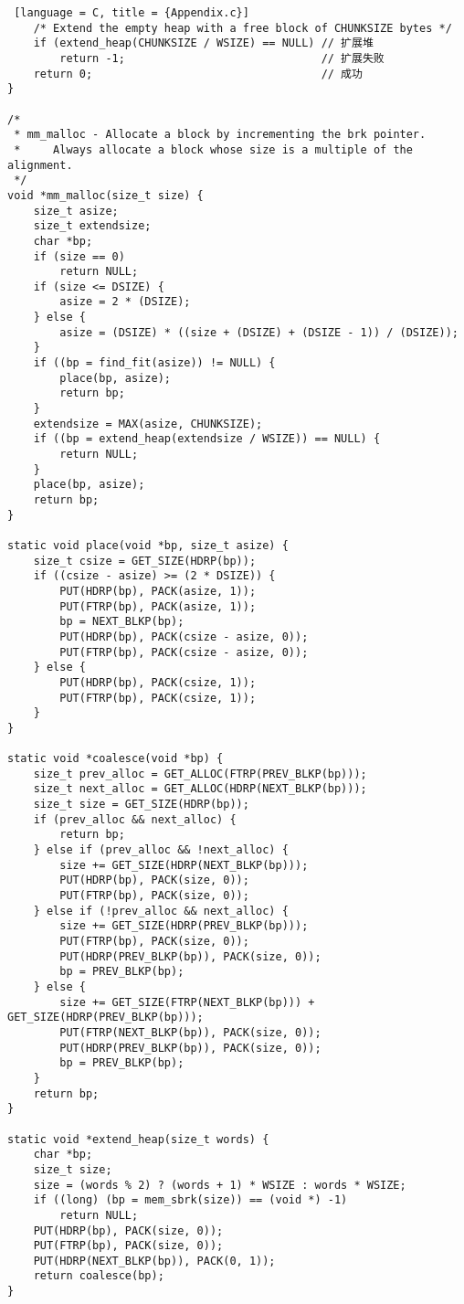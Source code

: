 \begin{lstlisting} [language = C, title = {Appendix.c}]
    /* Extend the empty heap with a free block of CHUNKSIZE bytes */
    if (extend_heap(CHUNKSIZE / WSIZE) == NULL) // 扩展堆
        return -1;                              // 扩展失败
    return 0;                                   // 成功
}

/*
 * mm_malloc - Allocate a block by incrementing the brk pointer.
 *     Always allocate a block whose size is a multiple of the alignment.
 */
void *mm_malloc(size_t size) {
    size_t asize;
    size_t extendsize;
    char *bp;
    if (size == 0)
        return NULL;
    if (size <= DSIZE) {
        asize = 2 * (DSIZE);
    } else {
        asize = (DSIZE) * ((size + (DSIZE) + (DSIZE - 1)) / (DSIZE));
    }
    if ((bp = find_fit(asize)) != NULL) {
        place(bp, asize);
        return bp;
    }
    extendsize = MAX(asize, CHUNKSIZE);
    if ((bp = extend_heap(extendsize / WSIZE)) == NULL) {
        return NULL;
    }
    place(bp, asize);
    return bp;
}

static void place(void *bp, size_t asize) {
    size_t csize = GET_SIZE(HDRP(bp));
    if ((csize - asize) >= (2 * DSIZE)) {
        PUT(HDRP(bp), PACK(asize, 1));
        PUT(FTRP(bp), PACK(asize, 1));
        bp = NEXT_BLKP(bp);
        PUT(HDRP(bp), PACK(csize - asize, 0));
        PUT(FTRP(bp), PACK(csize - asize, 0));
    } else {
        PUT(HDRP(bp), PACK(csize, 1));
        PUT(FTRP(bp), PACK(csize, 1));
    }
}

static void *coalesce(void *bp) {
    size_t prev_alloc = GET_ALLOC(FTRP(PREV_BLKP(bp)));
    size_t next_alloc = GET_ALLOC(HDRP(NEXT_BLKP(bp)));
    size_t size = GET_SIZE(HDRP(bp));
    if (prev_alloc && next_alloc) {
        return bp;
    } else if (prev_alloc && !next_alloc) {
        size += GET_SIZE(HDRP(NEXT_BLKP(bp)));
        PUT(HDRP(bp), PACK(size, 0));
        PUT(FTRP(bp), PACK(size, 0));
    } else if (!prev_alloc && next_alloc) {
        size += GET_SIZE(HDRP(PREV_BLKP(bp)));
        PUT(FTRP(bp), PACK(size, 0));
        PUT(HDRP(PREV_BLKP(bp)), PACK(size, 0));
        bp = PREV_BLKP(bp);
    } else {
        size += GET_SIZE(FTRP(NEXT_BLKP(bp))) + GET_SIZE(HDRP(PREV_BLKP(bp)));
        PUT(FTRP(NEXT_BLKP(bp)), PACK(size, 0));
        PUT(HDRP(PREV_BLKP(bp)), PACK(size, 0));
        bp = PREV_BLKP(bp);
    }
    return bp;
}

static void *extend_heap(size_t words) {
    char *bp;
    size_t size;
    size = (words % 2) ? (words + 1) * WSIZE : words * WSIZE;
    if ((long) (bp = mem_sbrk(size)) == (void *) -1)
        return NULL;
    PUT(HDRP(bp), PACK(size, 0));
    PUT(FTRP(bp), PACK(size, 0));
    PUT(HDRP(NEXT_BLKP(bp)), PACK(0, 1));
    return coalesce(bp);
}


\end{lstlisting}
